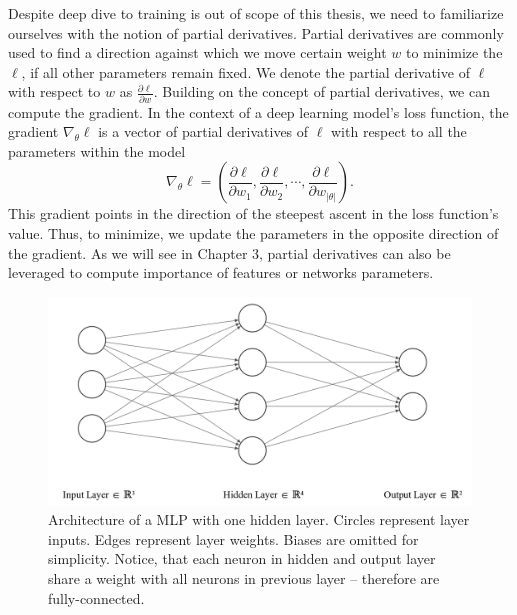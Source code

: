 Despite deep dive to training is out of scope of this thesis, we need to familiarize ourselves with the notion of partial derivatives.
Partial derivatives are commonly used to find a direction against which we move certain weight $w$ to minimize the $\ell$, if all other parameters remain fixed.
We denote the partial derivative of $\ell$ with respect to $w$ as $\frac{\partial \ell}{\partial w}$.
Building on the concept of partial derivatives, we can compute the gradient.
In the context of a deep learning model's loss function, the gradient $\nabla_{\theta}\ell$ is a vector of partial derivatives of $\ell$ with respect to all the parameters within the model
\begin{equation}
    \nabla_{\theta}\ell = \left( \frac{\partial \ell}{\partial w_1}, \frac{\partial \ell}{\partial w_2}, \cdots, \frac{\partial \ell}{\partial w_{|\theta|}} \right).
\end{equation}
This gradient points in the direction of the steepest ascent in the loss function's value.
Thus, to minimize, we update the parameters in the opposite direction of the gradient.
As we will see in Chapter 3, partial derivatives can also be leveraged to compute importance of features or networks parameters.

\begin{figure}
    \begin{center}
    \begin{minipage}{.75\textwidth}
      \includegraphics[width=\textwidth]{img/nn.png}
    \end{minipage}
    \caption{Architecture of a MLP with one hidden layer. Circles represent layer inputs. Edges represent layer weights. Biases are omitted for simplicity. Notice, that each neuron in hidden and output layer share a weight with all neurons in previous layer -- therefore are fully-connected.}
    \label{fig:simple-mlp}
    \end{center}
\end{figure}

